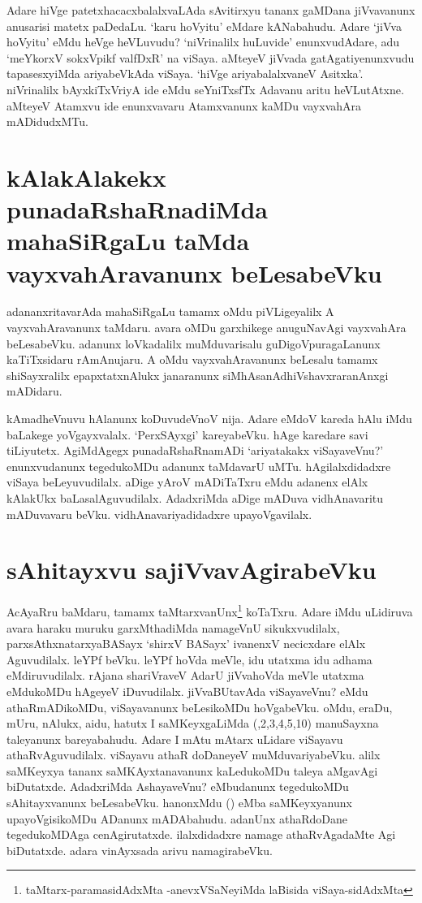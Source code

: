Adare hiVge patetxhacacxbalalxvaLAda sAvitirxyu tananx gaMDana jiVvavanunx anusarisi matetx paDedaLu. `karu hoVyitu' eMdare kANabahudu. Adare `jiVva hoVyitu' eMdu heVge heVLuvudu? `niVrinalilx huLuvide' enunxvudAdare, adu `meYkorxV sokxVpikf valfDxR' na viSaya. aMteyeV jiVvada gatAgatiyenunxvudu tapasesxyiMda ariyabeVkAda viSaya. `hiVge ariyabalalxvaneV Asitxka'. niVrinalilx bAyxkiTxVriyA ide eMdu seYniTxsfTx Adavanu aritu heVLutAtxne. aMteyeV Atamxvu ide enunxvavaru Atamxvanunx kaMDu vayxvahAra mADidudxMTu. 

\section*{kAlakAlakekx punadaRshaRnadiMda mahaSiRgaLu taMda vayxvahAravanunx beLesabeVku}

adananxritavarAda mahaSiRgaLu tamamx oMdu piVLigeyalilx A vayxvahAravanunx taMdaru. avara oMDu garxhikege anuguNavAgi vayxvahAra beLesabeVku. adanunx loVkadalilx muMduvarisalu guDigoVpuragaLanunx kaTiTxsidaru rAmAnujaru. A oMdu vayxvahAravanunx beLesalu tamamx shiSayxralilx epapxtatxnAlukx  janaranunx siMhAsanAdhiVshavxraranAnxgi mADidaru.

kAmadheVnuvu hAlanunx koDuvudeVnoV nija. Adare eMdoV kareda hAlu iMdu baLakege yoVgayxvalalx. `PerxSAyxgi' kareyabeVku. hAge karedare savi tiLiyutetx. AgiMdAgegx punadaRshaRnamADi `ariyatakakx viSayaveVnu?' enunxvudanunx tegedukoMDu adanunx taMdavarU uMTu. hAgilalxdidadxre viSaya beLeyuvudilalx. aDige yAroV mADiTaTxru eMdu adanenx elAlx kAlakUkx baLasalAguvudilalx. AdadxriMda aDige mADuva vidhAnavaritu mADuvavaru beVku. vidhAnavariyadidadxre upayoVgavilalx.

\section*{sAhitayxvu sajiVvavAgirabeVku}

AcAyaRru baMdaru, tamamx taMtarxvanUnx\footnote{taMtarx-paramasidAdxMta -anevxVSaNeyiMda laBisida viSaya-sidAdxMta} koTaTxru. Adare iMdu uLidiruva avara haraku muruku garxMthadiMda namageVnU sikukxvudilalx, parxsAthxnatarxyaBASayx `shirxV BASayx' ivanenxV necicxdare elAlx Aguvudilalx. leYPf beVku. leYPf hoVda meVle, idu utatxma idu adhama eMdiruvudilalx. rAjana shariVraveV AdarU jiVvahoVda meVle utatxma eMdukoMDu hAgeyeV iDuvudilalx. jiVvaBUtavAda viSayaveVnu? eMdu athaRmADikoMDu, viSayavanunx beLesikoMDu hoVgabeVku. oMdu, eraDu, mUru, nAlukx, aidu, hatutx I saMKeyxgaLiMda {(,2,3,4,5,10)} manuSayxna taleyanunx bareyabahudu. Adare I mAtu mAtarx uLidare viSayavu athaRvAguvudilalx. viSayavu athaR doDaneyeV muMduvariyabeVku. alilx saMKeyxya tananx saMKAyxtanavanunx kaLedukoMDu taleya aMgavAgi biDutatxde. AdadxriMda AshayaveVnu? eMbudanunx tegedukoMDu sAhitayxvanunx beLesabeVku. hanonxMdu {()} eMba saMKeyxyanunx upayoVgisikoMDu ADanunx mADAbahudu. adanUnx athaRdoDane tegedukoMDAga cenAgirutatxde. ilalxdidadxre namage athaRvAgadaMte Agi biDutatxde. adara vinAyxsada arivu namagirabeVku.

